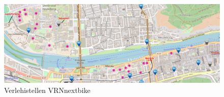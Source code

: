     \begin{figure}
      \includegraphics[width=1.0\textwidth]{chapters/heidelberg/nextbike}
      \caption{Verlehistellen VRNnextbike}
      \label{nextbike}
    \end{figure}

